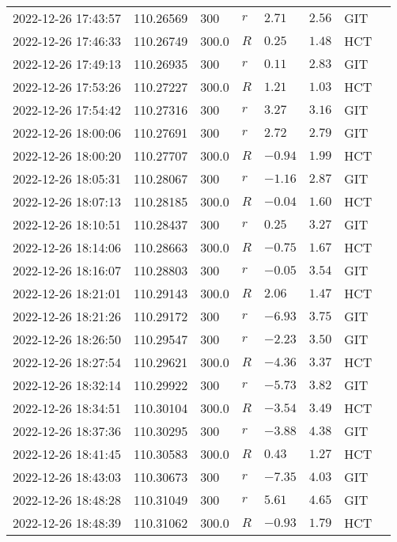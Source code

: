 \documentclass{nature_plusfigure}
\begin{document}
\begin{supplement}
\begin{center}
\begin{longtable}{llllllll}
2022-12-26 17:43:57 & 110.26569 & 300 & $r$ & $2.71$ & $2.56$ & GIT &  \\ 
2022-12-26 17:46:33 & 110.26749 & 300.0 & $R$ & $0.25$ & $1.48$ & HCT &  \\ 
2022-12-26 17:49:13 & 110.26935 & 300 & $r$ & $0.11$ & $2.83$ & GIT &  \\ 
2022-12-26 17:53:26 & 110.27227 & 300.0 & $R$ & $1.21$ & $1.03$ & HCT &  \\ 
2022-12-26 17:54:42 & 110.27316 & 300 & $r$ & $3.27$ & $3.16$ & GIT &  \\ 
2022-12-26 18:00:06 & 110.27691 & 300 & $r$ & $2.72$ & $2.79$ & GIT &  \\ 
2022-12-26 18:00:20 & 110.27707 & 300.0 & $R$ & $-0.94$ & $1.99$ & HCT &  \\ 
2022-12-26 18:05:31 & 110.28067 & 300 & $r$ & $-1.16$ & $2.87$ & GIT &  \\ 
2022-12-26 18:07:13 & 110.28185 & 300.0 & $R$ & $-0.04$ & $1.60$ & HCT &  \\ 
2022-12-26 18:10:51 & 110.28437 & 300 & $r$ & $0.25$ & $3.27$ & GIT &  \\ 
2022-12-26 18:14:06 & 110.28663 & 300.0 & $R$ & $-0.75$ & $1.67$ & HCT &  \\ 
2022-12-26 18:16:07 & 110.28803 & 300 & $r$ & $-0.05$ & $3.54$ & GIT &  \\ 
2022-12-26 18:21:01 & 110.29143 & 300.0 & $R$ & $2.06$ & $1.47$ & HCT &  \\ 
2022-12-26 18:21:26 & 110.29172 & 300 & $r$ & $-6.93$ & $3.75$ & GIT &  \\ 
2022-12-26 18:26:50 & 110.29547 & 300 & $r$ & $-2.23$ & $3.50$ & GIT &  \\ 
2022-12-26 18:27:54 & 110.29621 & 300.0 & $R$ & $-4.36$ & $3.37$ & HCT &  \\ 
2022-12-26 18:32:14 & 110.29922 & 300 & $r$ & $-5.73$ & $3.82$ & GIT &  \\ 
2022-12-26 18:34:51 & 110.30104 & 300.0 & $R$ & $-3.54$ & $3.49$ & HCT &  \\ 
2022-12-26 18:37:36 & 110.30295 & 300 & $r$ & $-3.88$ & $4.38$ & GIT &  \\ 
2022-12-26 18:41:45 & 110.30583 & 300.0 & $R$ & $0.43$ & $1.27$ & HCT &  \\ 
2022-12-26 18:43:03 & 110.30673 & 300 & $r$ & $-7.35$ & $4.03$ & GIT &  \\ 
2022-12-26 18:48:28 & 110.31049 & 300 & $r$ & $5.61$ & $4.65$ & GIT &  \\ 
2022-12-26 18:48:39 & 110.31062 & 300.0 & $R$ & $-0.93$ & $1.79$ & HCT &  \\ 

\end{longtable}
\end{center}
\end{supplement}
\end{document}
